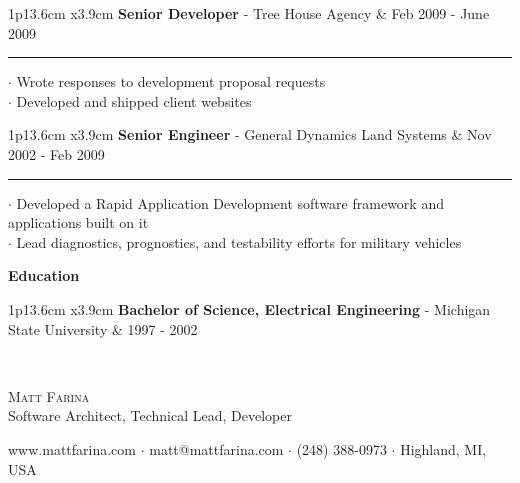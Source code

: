 \documentclass[10pt,A4]{article}
\newcommand{\cvsection}[1]
{
	\begin{center}
		\large\textcolor{sectcol}{\textbf{#1}}
	\end{center}
}
\newcommand{\cvevent}[5]
{

\begin{tabular*}{1\textwidth}{p{13.6cm}  x{3.9cm}}
	\textbf{#2} - \textcolor{bgcol}{#3} &   \vspace{2.5pt}\textcolor{sectcol}{#1}
\end{tabular*}

\vspace{-8pt}
\textcolor{softcol}{\hrule}
\vspace{6pt}

  $\cdot$ #4\\[3pt]
  $\cdot$ #5\\[6pt]

}
\newcommand{\cveventzero}[3]
{

\begin{tabular*}{1\textwidth}{p{13.6cm}  x{3.9cm}}
	\textbf{#2} - \textcolor{bgcol}{#3} &   \vspace{2.5pt}\textcolor{sectcol}{#1}
\end{tabular*}

\vspace{-8pt}
\vspace{6pt}

}
\newcommand{\mystrut}{\rule[-.3\baselineskip]{0pt}{\baselineskip}}
\begin{document}

%
\cvevent{Feb 2009 - June 2009}{Senior Developer}{Tree House Agency}{Wrote responses to development proposal requests}{Developed and shipped client websites}



%
\cvevent{Nov 2002 - Feb 2009}{Senior Engineer}{General Dynamics Land Systems}{Developed a Rapid Application Development software framework and applications built on it}{Lead diagnostics, prognostics, and testability efforts for military vehicles}

\cvsection{Education}

%
\cveventzero{1997 - 2002}{Bachelor of Science, Electrical Engineering}{Michigan State University}



\null
\vspace*{\fill}
\hspace{-0.25\linewidth}\colorbox{bgcol}{\makebox[1.5\linewidth][c]{\mystrut \small \textcolor{white}{www.mattfarina.com} $\cdot$ \textcolor{white}{github.com/mattfarina} $\cdot$ \textcolor{white}{linkedin.com/in/matthewfarina}}}
\\[-6pt]
\newpage

\vspace{-8pt}
\begin{center}
	\HUGE \textsc{Matt Farina}\\[2pt]
	\small Software Architect, Technical Lead, Developer
\end{center}

\begin{center}
	\small \textcolor{bgcol}{www.mattfarina.com $\cdot$ matt@mattfarina.com $\cdot$ (248) 388-0973 $\cdot$ Highland, MI, USA}
\end{center}
\end{document}
